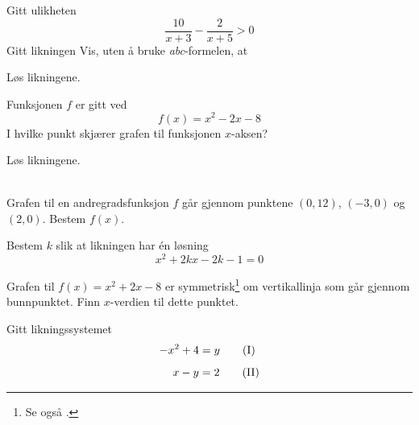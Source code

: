 Gitt ulikheten
\[ \frac{10}{x+3}-\frac{2}{x+5}>0 \]
\nes
{} 
Gitt likningen
Vis, uten å bruke \textit{abc}-formelen, at

Løs likningene.\os
{}\\[12pt]

Funksjonen $ f $ er gitt ved
\[ f(x)=x^2-2x-8 \]
I hvilke punkt skjærer grafen til funksjonen $ x $-aksen? 

Løs likningene.\os
{}
\\[12pt]
\\[12pt]

\newpage
{}
Grafen til en andregradsfunksjon $ f $ går gjennom punktene $ (0, 12) $, $ (-3, 0) $ og $ (2, 0) $. Bestem $ f(x) $.

Bestem $k$ slik at likningen har én løsning
\[ x^2+2kx-2k-1=0 \]

Grafen til $ {f(x)=x^2+2x-8} $ er symmetrisk\footnote{Se også .} om vertikallinja som går gjennom bunnpunktet. Finn $ x $-verdien til dette punktet.

Gitt likningssystemet 
\begin{align*}
	-x^2+4 &= y \tag{I}\br
	x-y &= 2 \tag{II}
\end{align*}

